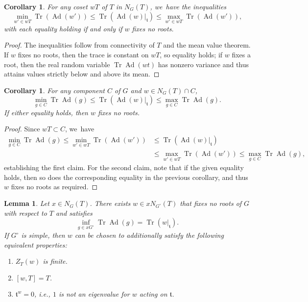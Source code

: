 \documentclass[JEP,XML,SOM,Unicode,NoFloatCountersInSection,published]{cedram}
\newenvironment{enumeratea}
{\bgroup\def\theenumi{\alph{enumi}}\def\theenumii{\roman{enumii}}\begin{enumerate}}
{\end{enumerate}\egroup}
\newtheorem{lem}[equation]{Lemma}
\newtheorem{cor}[equation]{Corollary}
\theoremstyle{definition}
\let\ic\circ
\newcommand{\mft}{\mathfrak{t}}
\DeclareMathOperator{\Tr}{Tr}
\DeclareMathOperator{\Ad}{Ad}
\begin{document}
\begin{cor} \label{mean.cor1}
For any coset $wT$ of $T$ in $N_G(T)$, we~have the inequalities
\[
\min_{w'\in wT} \Tr(\Ad(w')) \le \Tr(\Ad(w)\vert_{\mft})\le \max_{w'\in wT} \Tr(\Ad(w')),
\]
with each equality holding if and only if $w$ fixes no roots.
\end{cor}

\begin{proof}
The inequalities follow from connectivity of $T$ and the mean value theorem. If $w$ fixes no roots, then the trace is constant on $wT$, so equality holds; if $w$ fixes a root, then the real random variable $\Tr\Ad(wt)$ has nonzero variance and thus attains values strictly below and above its mean.
\end{proof}

\begin{cor} \label{mean.cor2}
For any component $C$ of $G$ and $w \in N_G(T)\cap C$,
\[
\min_{g\in C}\Tr\Ad(g)\le \Tr(\Ad(w)\vert_{\mft})\le \max_{g\in C}\Tr\Ad(g).
\]
If either equality holds, then $w$ fixes no roots.
\end{cor}

\begin{proof}
Since $wT\subset C$, we~have
\begin{align*}
\min_{g\in C}\Tr\Ad(g)\le \min_{w'\in wT} \Tr(\Ad(w')) &\le \Tr(\Ad(w)\vert_{\mft}) \\
&\le \max_{w'\in wT} \Tr(\Ad(w'))\le \max_{g\in C}\Tr\Ad(g),
\end{align*}
establishing the first claim. For the second claim, note that if the given equality holds, then so does the corresponding equality in the previous corollary, and thus $w$ fixes no roots as required.
\end{proof}

\begin{lem} \label{lem.3p}
Let $x \in N_G(T)$. There exists $w \in xN_{G^\ic}(T)$ that fixes no roots of $G$ with respect to $T$ and
satisfies
\begin{equation} \label{3p.1}
\inf_{g \in xG^\ic} \Tr \Ad(g) = \Tr(w \vert_\mft).
\end{equation}
If $G^\ic$ is simple, then $w$ can be chosen to additionally satisfy the following equivalent properties:
\begin{enumeratea}
\item \label{3p.finite} $Z_T(w)$ is finite.
\item \label{3p.comm} $[w, T] = T$.
\item \label{3p.eig} $\mft^{w} = 0$, i.e., $1$ is not an eigenvalue for $w$ acting on $\mft$.
\end{enumeratea}
\end{lem}
\end{document}
